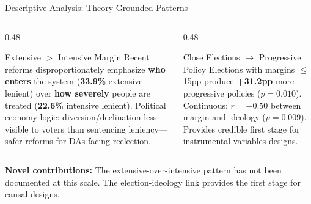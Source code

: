 \documentclass[aspectratio=169, 11pt]{beamer}
\begin{document}
\begin{frame}{Descriptive Analysis: Theory-Grounded Patterns}
\begin{columns}[T]
\begin{column}{0.48\textwidth}
\begin{block}{Extensive $>$ Intensive Margin}
Recent reforms disproportionately emphasize \textbf{who enters} the system (\textbf{33.9\%} extensive lenient) over \textbf{how severely} people are treated (\textbf{22.6\%} intensive lenient).
\vspace{4pt}
{\small\color{gray} Political economy logic: diversion/declination less visible to voters than sentencing leniency---safer reforms for DAs facing reelection.}
\end{block}
\end{column}
\begin{column}{0.48\textwidth}
\begin{block}{Close Elections $\to$ Progressive Policy}
Elections with margins $\leq$15pp produce \textbf{+31.2pp} more progressive policies ($p = 0.010$).
\vspace{4pt}
Continuous: $r = -0.50$ between margin and ideology ($p = 0.009$).
\vspace{4pt}
{\small\color{gray} Provides credible first stage for instrumental variables designs.}
\end{block}
\end{column}
\end{columns}
\vspace{8pt}
\begin{alertblock}{}
\textbf{Novel contributions:} The extensive-over-intensive pattern has not been documented at this scale. The election-ideology link provides the first stage for causal designs.
\end{alertblock}
\end{frame}
\end{document}
